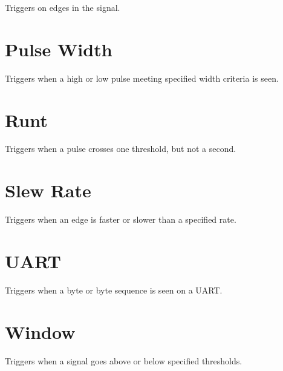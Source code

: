 Triggers on edges in the signal.

\section{Pulse Width}

Triggers when a high or low pulse meeting specified width criteria is seen.

\section{Runt}

Triggers when a pulse crosses one threshold, but not a second.

\section{Slew Rate}

Triggers when an edge is faster or slower than a specified rate.

\section{UART}

Triggers when a byte or byte sequence is seen on a UART.

\section{Window}

Triggers when a signal goes above or below specified thresholds.
